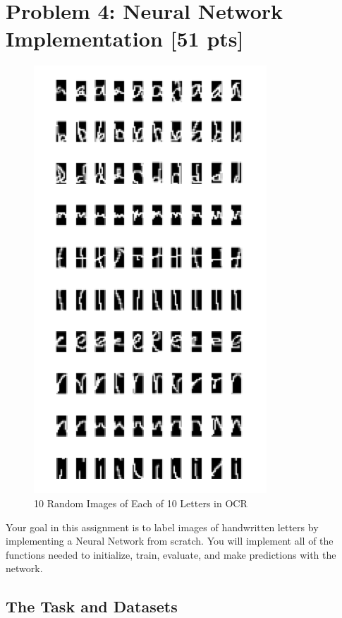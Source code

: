 
\section*{Problem 4: Neural Network Implementation [51 pts]}
\label{sec:code}

\begin{figure}[H]
    \centering
    \includegraphics[scale=0.99]{img/10lettergrid.png}
    \caption{10 Random Images of Each of 10 Letters in OCR}
    \label{fig:grid}
\end{figure}

Your goal in this assignment is to label images of handwritten letters by implementing a Neural Network from scratch. You will implement all of the functions needed to initialize, train, evaluate, and make predictions with the network. 

\subsection{The Task and Datasets}
\label{sec:dataset}

